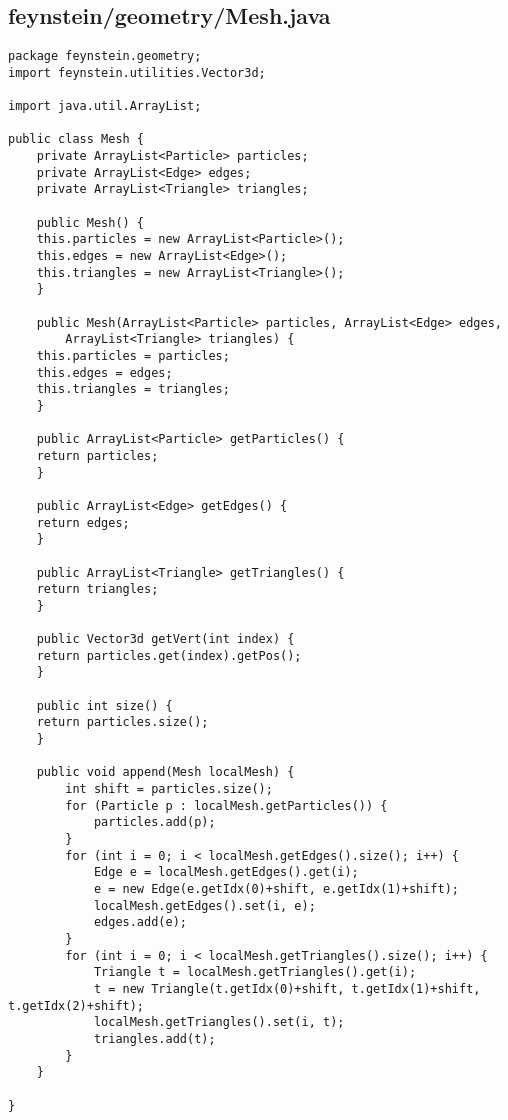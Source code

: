 \subsection*{feynstein/geometry/Mesh.java}
\begin{lstlisting}
package feynstein.geometry;
import feynstein.utilities.Vector3d;

import java.util.ArrayList;

public class Mesh {
    private ArrayList<Particle> particles;
    private ArrayList<Edge> edges;
    private ArrayList<Triangle> triangles;
	
    public Mesh() {
	this.particles = new ArrayList<Particle>();
	this.edges = new ArrayList<Edge>();
	this.triangles = new ArrayList<Triangle>();
    }
	
    public Mesh(ArrayList<Particle> particles, ArrayList<Edge> edges, 
		ArrayList<Triangle> triangles) {
	this.particles = particles;
	this.edges = edges;
	this.triangles = triangles;
    }
	
    public ArrayList<Particle> getParticles() {
	return particles;
    }
	
    public ArrayList<Edge> getEdges() {
	return edges;
    }
	
    public ArrayList<Triangle> getTriangles() {
	return triangles;
    }
	
    public Vector3d getVert(int index) {
	return particles.get(index).getPos();
    }
    
    public int size() {
	return particles.size();
    }
	
    public void append(Mesh localMesh) {
		int shift = particles.size();
		for (Particle p : localMesh.getParticles()) {
			particles.add(p);
		}
		for (int i = 0; i < localMesh.getEdges().size(); i++) {
			Edge e = localMesh.getEdges().get(i);
			e = new Edge(e.getIdx(0)+shift, e.getIdx(1)+shift);
			localMesh.getEdges().set(i, e);
			edges.add(e);
		}
		for (int i = 0; i < localMesh.getTriangles().size(); i++) {
			Triangle t = localMesh.getTriangles().get(i);
			t = new Triangle(t.getIdx(0)+shift, t.getIdx(1)+shift, t.getIdx(2)+shift);
			localMesh.getTriangles().set(i, t);
			triangles.add(t);
		}
	}
	
}\end{lstlisting}

